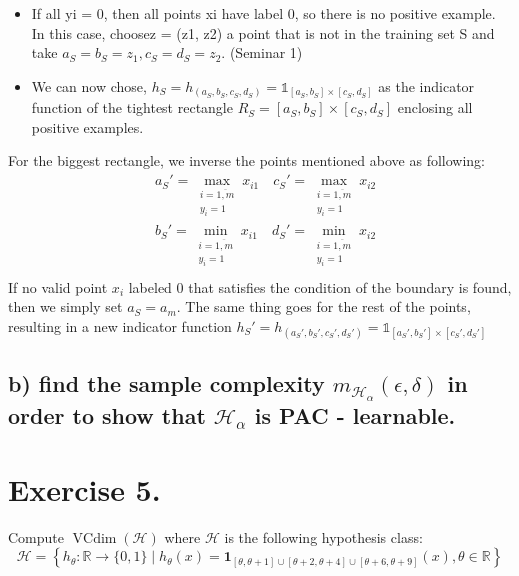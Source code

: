 \documentclass[11pt, a4paper]{article}
\begin{document}
\begin{large}
\begin{itemize}
    \item 
    If all yi = 0, then all points xi have label 0, so there is no positive example. In this case, choosez = (z1, z2) a point that is not in the training set S and take $a_S = b_S = z_1, c_S = d_S = z_2$. (Seminar 1)
    \item We can now chose, $h_S=h_{\left(a_S, b_{S}, c_{S}, d_{S}\right)}=\mathbb{1}_{\left[a_{S}, b_{S}\right] \times\left[c_{S}, d_{S}\right]}$ as the indicator function of the tightest rectangle $R_S=\left[a_{S}, b_{S}\right] \times\left[c_{S}, d_{S}\right]$ enclosing all positive examples.
\end{itemize}
For the biggest rectangle, we inverse the points mentioned above as following:
$$
\begin{aligned}
& a_{S}'=\max _{\substack{i=\overline{1, m} \\
y_i=1}} x_{i 1} \quad c_{S}'=\max _{\substack{i=\overline{1, m} \\
y_i=1}} x_{i 2} \\
& b_{S}'=\min _{\substack{i=\overline{1, m} \\
y_i=1}} x_{i 1} \quad d_{S}'=\min _{\substack{i=\overline{1, m} \\
y_i=1}} x_{i 2} \\
&
\end{aligned}
$$
If no valid point $x_{i}$ labeled 0 that satisfies the condition of the boundary is found, then we simply set $a_S = a_m$. The same thing goes for the rest of the points, resulting in a new indicator function $h_S'=h_{\left(a_S', b_{S}', c_{S}', d_{S}'\right)}=\mathbb{1}_{\left[a_{S}', b_{S}'\right] \times\left[c_{S}', d_{S}'\right]}$


\subsection{b) find the sample complexity $m_{\mathcal{H}_\alpha}(\epsilon, \delta)$ in order to show that $\mathcal{H}_\alpha$ is PAC - learnable.}


\section{Exercise 5.}
Compute $\operatorname{VCdim}(\mathcal{H})$ where $\mathcal{H}$ is the following hypothesis class:
$$
\mathcal{H}=\left\{h_\theta: \mathbb{R} \rightarrow\{0,1\} \mid h_\theta(x)=\mathbf{1}_{[\theta, \theta+1] \cup[\theta+2, \theta+4] \cup[\theta+6, \theta+9]}(x), \theta \in \mathbb{R}\right\}
$$


\end{large}
\end{document}
